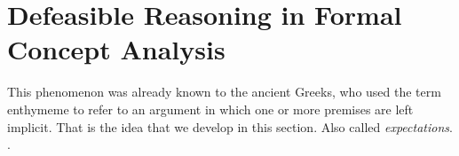 \chapter{Defeasible Reasoning in Formal Concept Analysis}
\label{chapter:defeasible-reasoning-in-fca}

This phenomenon was already known to the ancient Greeks, who used the term enthymeme to refer to an argument in which one or more premises are left implicit. That is the idea that we develop in this section. Also called \textit{expectations}. \cite{makinson2003bridges}.
